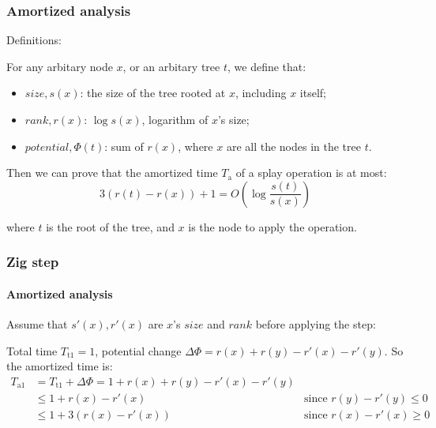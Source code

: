 \documentclass{beamer}
\theoremstyle{plain}
\begin{document}
    \begin{frame}
        \frametitle{Amortized analysis}
    
        Definitions:

        For any arbitary node $x$, or an arbitary tree $t$, we define that:

        \begin{itemize}
            \item $size, s(x)$: the size of the tree rooted at $x$, including $x$ itself; \pause
            \item $rank, r(x)$: $\log s(x)$, logarithm of $x$'s size; \pause
            \item $potential, \varPhi(t)$: sum of $r(x)$, where $x$ are all the nodes in the tree $t$.
        \end{itemize}

        Then we can prove that the amortized time $T_\mathrm{a}$ of a splay operation is at most: \[3(r(t) - r(x)) + 1 = O(\log \frac{s(t)}{s(x)})\]

        where $t$ is the root of the tree, and $x$ is the node to apply the operation.
    
    \end{frame}

    \begin{frame}[fragile]
        \frametitle{Zig step}
        \framesubtitle{Amortized analysis}
    
        Assume that $s'(x), r'(x)$ are $x$'s $size$ and $rank$ before applying the step:

        \begin{figure}
            \centering
        \end{figure}

        Total time $T_\mathrm{t1} = 1$, potential change $\Delta\varPhi = r(x) + r(y) - r'(x) - r'(y)$. So the amortized time is: \pause
        \begin{align*}
            T_\mathrm{a1} &= T_\mathrm{t1} + \Delta\varPhi = 1 + r(x) + r(y) - r'(x) - r'(y) \\
                         &\leq 1 + r(x) - r'(x) & \text{since } r(y) - r'(y) \leq 0 \\
                         &\leq 1 + 3(r(x) - r'(x)) & \text{since } r(x) - r'(x) \geq 0
        \end{align*}
    \end{frame}
\end{document}
